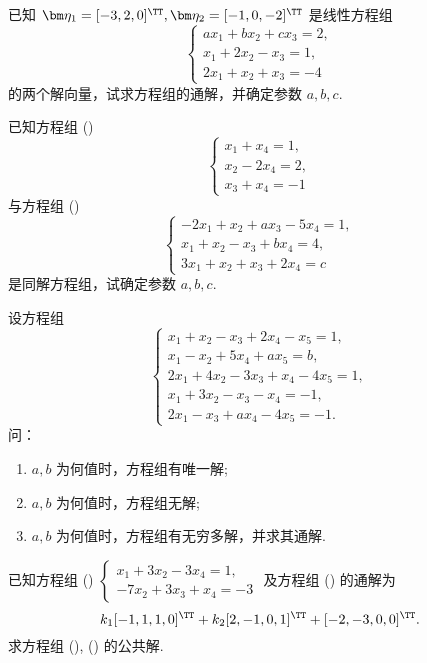 	\begin{titwo}
		已知 $\bm \eta_{1} = [-3,2,0]^{\TT}, \bm \eta_{2} = [-1,0,-2]^{\TT}$ 是线性方程组
		\[
			\begin{cases}
				a x_{1} + b x_{2} + c x_{3} = 2, \\
				x_{1} + 2x_{2} - x_{3} = 1, \\
				2x_{1} + x_{2} + x_{3} = -4
			\end{cases}
		\]
		的两个解向量，试求方程组的通解，并确定参数 $a,b,c$.
	\end{titwo}

	\begin{titwo}
		已知方程组 ()
		\[
			\begin{cases}
				x_{1} + x_{4} = 1, \\
				x_{2} - 2x_{4} = 2, \\
				x_{3} + x_{4} = -1
			\end{cases}
		\]
		与方程组 ()
		\[
			\begin{cases}
				-2x_{1} + x_{2} + ax_{3} - 5x_{4} = 1, \\
				x_{1} + x_{2} - x_{3} + bx_{4} = 4, \\
				3x_{1} + x_{2} + x_{3} + 2x_{4} = c
			\end{cases}
		\]
		是同解方程组，试确定参数 $a,b,c$.
	\end{titwo}

	\begin{titwo}
		设方程组
		\[
			\begin{cases}
				x_{1} + x_{2} - x_{3} + 2x_{4} - x_{5} = 1, \\
				x_{1} - x_{2} + 5x_{4} + ax_{5} = b, \\
				2x_{1} + 4x_{2} - 3x_{3} + x_{4} - 4x_{5} = 1, \\
				x_{1} + 3x_{2} - x_{3} - x_{4} = -1, \\
				2x_{1} - x_{3} + ax_{4} - 4x_{5} = -1.
			\end{cases}
		\]
		问：
		\begin{enumerate}
			\item $a,b$ 为何值时，方程组有唯一解;
			\item $a,b$ 为何值时，方程组无解;
			\item $a,b$ 为何值时，方程组有无穷多解，并求其通解.
		\end{enumerate}
	\end{titwo}

	\begin{titwo}
		已知方程组 () $\begin{cases}
			x_{1} + 3x_{2} - 3x_{4} = 1,\\
			-7x_{2} + 3x_{3} + x_{4} = -3
		\end{cases}$ 及方程组 () 的通解为
		\[
			k_{1} [-1,1,1,0]^{\TT} + k_{2} [2,-1,0,1]^{\TT} + [-2,-3,0,0]^{\TT}.
		\]
		求方程组 (), () 的公共解.
	\end{titwo}

